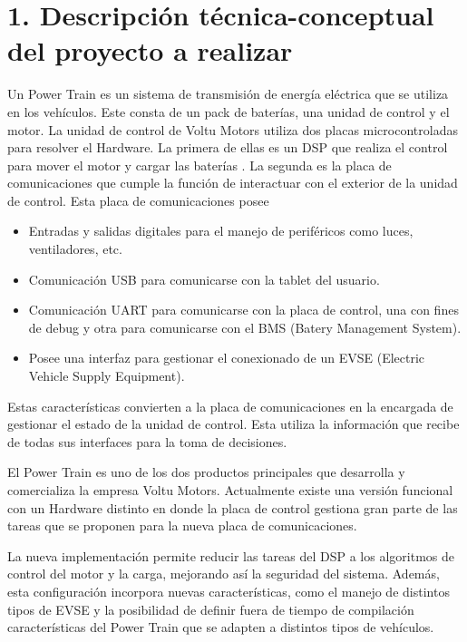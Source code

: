 \documentclass[
11pt, %
codirector, %
]{charter}
\begin{document}
\section{1. Descripción técnica-conceptual del proyecto a realizar}
\label{sec:descripcion}


Un Power Train es un sistema de transmisión de energía eléctrica que se utiliza en los vehículos. Este consta de un pack de baterías, una unidad de control y el motor. La unidad de control de Voltu Motors utiliza dos placas microcontroladas para resolver el Hardware.
La primera de ellas es un DSP que realiza el control para mover el motor y cargar las baterías . La segunda es la placa de comunicaciones que cumple la función de interactuar con el exterior de la unidad de control.
Esta placa de comunicaciones posee

\begin{itemize}
	\item Entradas y salidas digitales para el manejo de periféricos como luces, ventiladores, etc.
	\item Comunicación USB para comunicarse con la tablet del usuario.
	\item Comunicación UART para comunicarse con la placa de control, una con fines de debug y otra para comunicarse con el BMS (Batery Management System).
	\item Posee una interfaz para gestionar el conexionado de un EVSE (Electric Vehicle Supply Equipment).
\end{itemize}

Estas características convierten a la placa de comunicaciones en la encargada de gestionar el estado de la unidad de control. Esta utiliza la información que recibe de todas sus interfaces para la toma de decisiones.

El Power Train es uno de los dos productos principales que desarrolla y comercializa la empresa Voltu Motors. Actualmente existe una versión funcional con un Hardware distinto en donde la placa de control gestiona gran parte de las tareas que se proponen para la nueva placa de comunicaciones.

La nueva implementación permite reducir las tareas del DSP a los algoritmos de control del motor y la carga, mejorando así la seguridad del sistema. Además, esta configuración incorpora nuevas características, como el manejo de distintos tipos de EVSE y la posibilidad de definir fuera de tiempo de compilación características del Power Train que se adapten a distintos tipos de vehículos.
\end{document}
